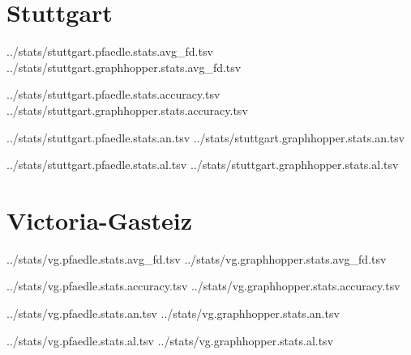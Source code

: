 
\section*{Stuttgart}

			{../stats/stuttgart.pfaedle.stats.avg_fd.tsv}
			{../stats/stuttgart.graphhopper.stats.avg_fd.tsv}

				{../stats/stuttgart.pfaedle.stats.accuracy.tsv}
				{../stats/stuttgart.graphhopper.stats.accuracy.tsv}

		{../stats/stuttgart.pfaedle.stats.an.tsv}
		{../stats/stuttgart.graphhopper.stats.an.tsv}

		{../stats/stuttgart.pfaedle.stats.al.tsv}
		{../stats/stuttgart.graphhopper.stats.al.tsv}


\section*{Victoria-Gasteiz}

			{../stats/vg.pfaedle.stats.avg_fd.tsv}
			{../stats/vg.graphhopper.stats.avg_fd.tsv}

				{../stats/vg.pfaedle.stats.accuracy.tsv}
				{../stats/vg.graphhopper.stats.accuracy.tsv}

		{../stats/vg.pfaedle.stats.an.tsv}
		{../stats/vg.graphhopper.stats.an.tsv}

		{../stats/vg.pfaedle.stats.al.tsv}
		{../stats/vg.graphhopper.stats.al.tsv}
	
	
